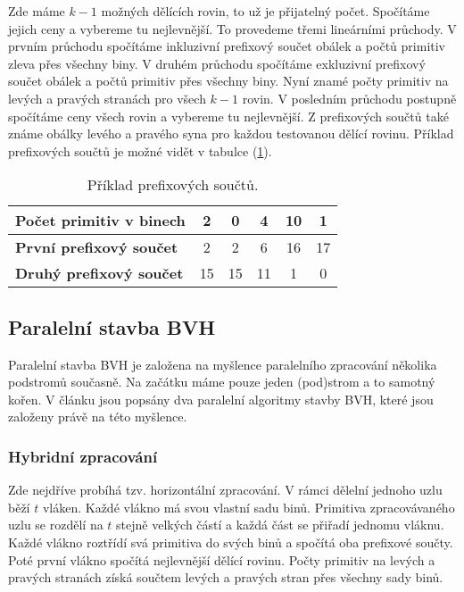\documentclass[11pt]{article}
\begin{document}
Zde máme $k - 1$ možných dělících rovin, to už je přijatelný počet. Spočítáme jejich ceny a vybereme tu nejlevnější. To provedeme třemi lineárními průchody. V prvním průchodu spočítáme inkluzivní prefixový součet obálek a počtů primitiv zleva přes všechny biny. V druhém průchodu spočítáme exkluzivní prefixový součet obálek a počtů primitiv přes všechny biny. Nyní znamé počty primitiv na levých a pravých stranách pro všech $k - 1$ rovin. V posledním průchodu postupně spočítáme ceny všech rovin a vybereme tu nejlevnější. Z prefixových součtů také známe obálky levého a pravého syna pro každou testovanou dělící rovinu. Příklad prefixových součtů je možné vidět v tabulce (\ref{binning}).

\begin{table}[h]
\begin{center}
\begin{tabular}{|l|c|c|c|c|c|}
\hline
\textbf{Počet primitiv v binech} & 2 & 0 & 4 & 10 & 1\\
\hline
\textbf{První prefixový součet} & 2 & 2 & 6 & 16 & 17\\
\hline
\textbf{Druhý prefixový součet} & 15 & 15  & 11 & 1 & 0\\
\hline
\end{tabular}
\end{center}
\caption{Příklad prefixových součtů.}
\label{binning}
\end{table}

\subsection{Paralelní stavba BVH}
Paralelní stavba BVH je založena na myšlence paralelního zpracování několika podstromů současně. Na začátku máme pouze jeden (pod)strom a to samotný kořen. V článku \cite{wald} jsou popsány dva paralelní algoritmy stavby BVH, které jsou založeny právě na této myšlence.

\subsubsection{Hybridní zpracování}
Zde nejdříve probíhá tzv. horizontální zpracování. V rámci dělelní jednoho uzlu běží $t$ vláken. Každé vlákno má svou vlastní sadu binů. Primitiva zpracovávaného uzlu se rozdělí na $t$ stejně velkých částí a každá část se přiřadí jednomu vláknu. Každé vlákno roztřídí svá primitiva do svých binů a spočítá oba prefixové součty. Poté první vlákno spočítá nejlevnější dělící rovinu. Počty primitiv na levých a pravých stranách získá součtem levých a pravých stran přes všechny sady binů.
\end{document}
